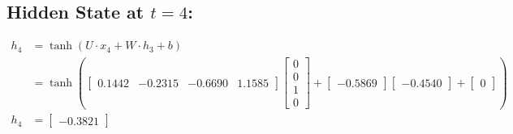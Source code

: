 \documentclass{article}
\begin{document}
\subsection{Hidden State at \(t=4\):}

\begin{align*}
h_4 &= \tanh(U \cdot x_4 + W \cdot h_3 + b) \\
&= \tanh\left(\begin{bmatrix}
0.1442 & -0.2315 & -0.6690 & 1.1585
\end{bmatrix} \begin{bmatrix}
0 \\
0 \\
1 \\
0
\end{bmatrix} + \begin{bmatrix}
-0.5869
\end{bmatrix} \begin{bmatrix}
-0.4540
\end{bmatrix} + \begin{bmatrix}
0
\end{bmatrix}\right) \\
h_4 &= \begin{bmatrix}
-0.3821
\end{bmatrix}
\end{align*}
\end{document}
